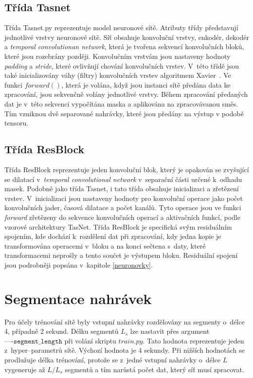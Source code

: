\subsection*{Třída Tasnet}
Třída Tasnet.py reprezentuje model neuronové sítě. Atributy třídy představují jednotlivé vrstvy neuronové sítě. Síť obsahuje konvoluční vrstvy, enkodér, dekodér a \textit{temporal convolutionan network}, která je tvořena sekvencí konvolučních bloků, které jsou rozebrány později. Konvolučním vrstvám jsou nastaveny hodnoty \textit{padding} a \textit{stride}, které ovlivňují chování konvolučních vrstev. V~této třídě jsou také inicializovány váhy (filtry) konvolučních vrstev algoritmem Xavier~\cite{pmlr-v9-glorot10a}. Ve funkci $forward()$, která je volána, když jsou instanci sítě předána data ke zpracování, jsou sekvenčně volány jednotlivé vrstvy. Během zpracování předaných dat je v~této sekvenci vypočítána maska a aplikována na zpracovávanou směs. Tím vzniknou dvě separované nahrávky, které jsou předány na výstup v podobě tensoru. 


\subsection*{Třída ResBlock}
Třída ResBlock reprezentuje jeden konvoluční blok, který je opakován se zvyšující se dilatací v~\textit{temporal convolutional network} v~separační části určené k~odhadu masek. Podobně jako třída Tasnet, i tato třída obsahuje inicializaci a zřetězení vrstev. V~inicializaci jsou nastaveny hodnoty pro konvoluční operace jako počet konvolučních jader, časová dilatace a počet kanálů. Tyto operace jsou ve funkci \textit{forward} zřetězeny do sekvence konvolučních operací a aktivačních funkcí, podle vzorové architektury TasNet. Třída ResBlock je specifická svým residuálním spojením, kde dochází k~rozdělení dat při zpracování, kdy jedna kopie je transformována operacemi v~bloku a na konci sečtena s~daty, které transformacemi neprošly a tento součet je výstupem bloku. Residuální spojení jsou podrobněji popsána v~kapitole \ref{neuronovky}.


\section{Segmentace nahrávek}
\label{sec:segmentace}
Pro účely trénování sítě byly vstupní nahrávky rozdělovány na segmenty o~délce 4, případně 2 sekund. Délku segmentů $L_s$ lze nastavit přes argument $\texttt{----segment\_length}$ při volání skriptu $train.py$. Tato hodnota reprezentuje jeden z~hyper--parametrů sítě. Výchozí hodnota je 4 sekundy. Při nižších hodnotách se prodlužuje délka trénování, protože se z~jedné vstupní nahrávky o~délce $L$ vygeneruje až $L/L_s$  segmentů a tím narůstá počet dat, který síť musí zpracovat. 

